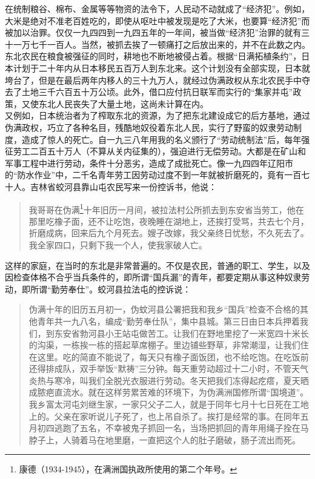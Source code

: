 在统制粮谷、棉布、金属等等物资的法令下，人民动不动就成了“经济犯”。例如，大米是绝对不准老百姓吃的，即使从呕吐中被发现是吃了大米，也要算“经济犯”而被加以治罪。仅仅一九四四到一九四五年的一年间，被当做“经济犯”治罪的就有三十一万七千一百人。当然，被抓去挨了一顿痛打之后放出来的，并不在此数之内。\\

东北农民在粮食被强征的同时，耕地也不断地被侵占着。根据“日满拓植条约”，日本计划于二十年内从日本移民五百万人到东北来。这个计划没有全部实现，日本就垮台了，但是在最后两年内移人的三十九万人，就经过伪满政权从东北农民手中夺去了土地三千六百五十万公顷。此外，借口应付抗日联军而实行的“集家并屯”政策，又使东北人民丧失了大量土地，这尚未计算在内。\\

又例如，日本统治者为了榨取东北的资源，为了把东北建设成它的后方基地，通过伪满政权，巧立了各种名目，残酷地奴役着东北人民，实行了野蛮的奴隶劳动制度，造成了惊人的死亡。自一九三八年用我的名义颁行了“劳动统制法”后，每年强征劳工二百五十万人（不算从关内征集的），强迫进行无偿劳动。大都是在矿山和军事工程中进行劳动，条件十分恶劣，造成了成批死亡。像一九四四年辽阳市的“防水作业”中，二千名青年劳工因劳动过度不到一年就被折磨死的，竟有一百七十人。吉林省蛟河县靠山屯农民写来一份控诉书，他说：\\

\begin{quote}
	我哥哥在伪满\footnote{康德（1934-1945），在满洲国执政所使用的第二个年号。}十年旧历一月间，被拉法村公所抓去到东安省当劳工，他在那里吃橡子面，还不让吃饱，夜晚睡在湖地上，还挨打受骂，共去七个月，折磨成病，回来后九个月死去。嫂子改嫁，我父亲终日忧愁，不久死去了。我全家四口，只剩下我一个人，使我家破人亡。\\
\end{quote}

这样的家庭，在当时的东北是非常普遍的。不仅是农民，普通的职工、学生，以及因检查体格不合乎当兵条件的，即所谓“国兵漏”的青年，都要定期从事这种奴隶劳动，即所谓“勤劳奉仕”。蛟河县拉法屯的控诉说：\\

\begin{quote}
	伪满十年的旧历五月初一，伪蚊河县公署把我和我乡“国兵”检查不合格的其他青年共一九八名，编成“勤劳奉仕队”，集中县城。第三日由日本兵押着我们，到东安省勃河县小王站屯做苦工。让我们在野地里挖了一米宽四十米长的沟渠，一栋挨一栋的搭起草席棚子。里边铺些野草，非常潮湿，让我们住在这里。吃的简直不能说了，每天只有橡子面饭团，也不给吃饱。在吃饭前还得排成队，双手举饭“默祷”三分钟。每天重劳动超过十二小时，不管天气炎热与寒冷，叫我们全脱光衣服进行劳动。冬天把我们冻得起疙瘩，夏天晒成脓疤直流水。就在这样劳累苦难的环境下，为伪满洲国修所谓“国境道”。我乡富太河屯刘继生家，一家只父子二人，就是于同年七月十七日死在工地上的。父亲在家听说儿子死了，也上吊自杀了。挨打是经常的事。在同年五月初四逃跑了五名，不幸被鬼子抓回一名，当场把抓回的青年用绳子拴在马脖子上，人骑着马在地里磨，一直把这个人的肚子磨破，肠子流出而死。\\
\end{quote}

